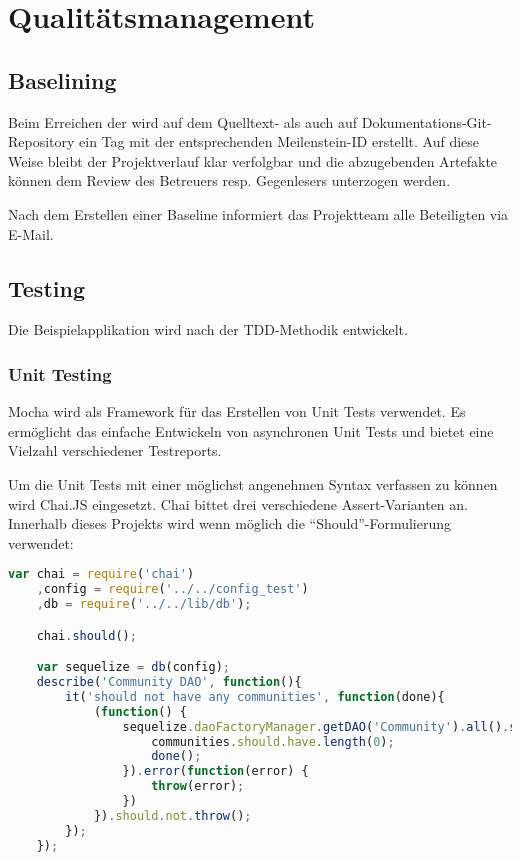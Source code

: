 \section{Qualitätsmanagement}
\label{sec:qualitymanagement}

\subsection{Baselining}
Beim Erreichen der  wird auf dem Quelltext- als auch auf Dokumentations-Git-Repository ein Tag mit der entsprechenden Meilenstein-ID erstellt. Auf diese Weise bleibt der Projektverlauf klar verfolgbar und die abzugebenden Artefakte können dem Review des Betreuers resp. Gegenlesers unterzogen werden.

Nach dem Erstellen einer Baseline informiert das Projektteam alle Beteiligten via E-Mail.

\subsection{Testing}
Die Beispielapplikation wird nach der \gls{TDD}-Methodik entwickelt.

\subsubsection*{Unit Testing}
Mocha \cite{Mocha} wird als Framework für das Erstellen von Unit Tests verwendet. Es ermöglicht das einfache Entwickeln von asynchronen Unit Tests und bietet eine Vielzahl verschiedener Testreports.

Um die Unit Tests mit einer möglichst angenehmen Syntax verfassen zu können wird Chai.JS \cite{ChaiJS} eingesetzt. Chai bittet drei verschiedene Assert-Varianten an. Innerhalb dieses Projekts wird wenn möglich die ``Should''-Formulierung verwendet:

\begin{lstlisting}[language=JavaScript, caption=Beispiel eines Unit Tests mit Mocha und Chai.js]
var chai = require('chai')
	,config = require('../../config_test')
	,db = require('../../lib/db');

	chai.should();

	var sequelize = db(config);
	describe('Community DAO', function(){
		it('should not have any communities', function(done){
			(function() {
				sequelize.daoFactoryManager.getDAO('Community').all().success(function(communities) {
					communities.should.have.length(0);
					done();
				}).error(function(error) {
					throw(error);
				})
			}).should.not.throw();
		});
	});
\end{lstlisting}

